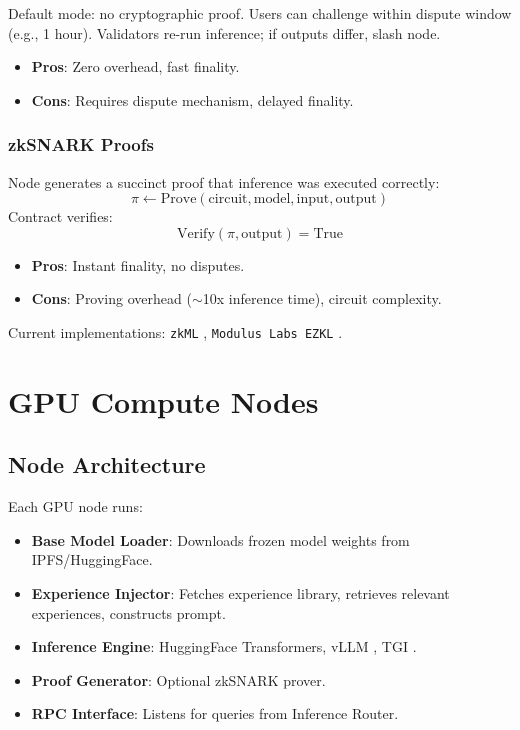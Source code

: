 \documentclass[11pt,a4paper]{article}
\begin{document}
Default mode: no cryptographic proof. Users can challenge within dispute window (e.g., 1 hour). Validators re-run inference; if outputs differ, slash node.

\begin{itemize}
\item \textbf{Pros}: Zero overhead, fast finality.
\item \textbf{Cons}: Requires dispute mechanism, delayed finality.
\end{itemize}

\subsubsection{zkSNARK Proofs}

Node generates a succinct proof that inference was executed correctly:
\[
\pi \leftarrow \text{Prove}(\text{circuit}, \text{model}, \text{input}, \text{output})
\]
Contract verifies:
\[
\text{Verify}(\pi, \text{output}) = \text{True}
\]

\begin{itemize}
\item \textbf{Pros}: Instant finality, no disputes.
\item \textbf{Cons}: Proving overhead ($\sim$10x inference time), circuit complexity.
\end{itemize}

Current implementations: \texttt{zkML} \cite{zkml2023}, \texttt{Modulus Labs EZKL} \cite{ezkl2023}.

\section{GPU Compute Nodes}

\subsection{Node Architecture}

Each GPU node runs:
\begin{itemize}
\item \textbf{Base Model Loader}: Downloads frozen model weights from IPFS/HuggingFace.
\item \textbf{Experience Injector}: Fetches experience library, retrieves relevant experiences, constructs prompt.
\item \textbf{Inference Engine}: HuggingFace Transformers, vLLM \cite{kwon2023vllm}, TGI \cite{huggingface2023tgi}.
\item \textbf{Proof Generator}: Optional zkSNARK prover.
\item \textbf{RPC Interface}: Listens for queries from Inference Router.
\end{itemize}
\end{document}
